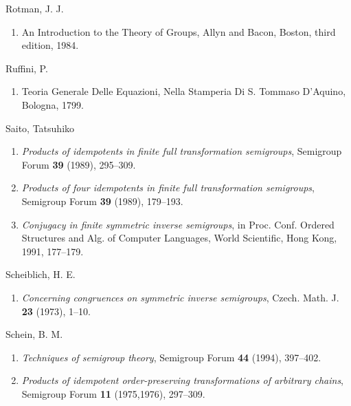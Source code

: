 \documentclass{surv-l}
\numberwithin{equation}{section}
\numberwithin{table}{section}
\numberwithin{figure}{section}
\theoremstyle{plain}
\theoremstyle{definition}
\begin{document}
\begin{thebibliography}{}
\item[] Rotman, J. J.
\begin{enumerate}
\item \label{bib65} An Introduction to the Theory of Groups, Allyn and Bacon,
Boston, third edition, 1984.
\end{enumerate}

\item[] Ruffini, P.
\begin{enumerate}
\item \label{bib66} Teoria Generale Delle Equazioni, Nella Stamperia Di S.
Tommaso D'Aquino, Bologna, 1799.
\end{enumerate}

\item[] Saito, Tatsuhiko
\begin{enumerate}
\item \label{bib67} \emph{Products of idempotents in finite full
transformation semigroups}, Semigroup Forum \textbf{39}
(1989), 295--309.

\item \label{bib67a} \emph{Products of four idempotents in finite full
transformation semigroups}, Semigroup Forum \textbf{39}
(1989), 179--193.

\item \label{bib67b} \emph{Conjugacy in finite symmetric inverse
semigroups}, in Proc. Conf. Ordered Structures and Alg. of
Computer Languages, World Scientific, Hong Kong, 1991,
177--179.
\end{enumerate}

\item[] Scheiblich, H. E.
\begin{enumerate}
\item \label{bib68} \emph{Concerning congruences on symmetric inverse
semigroups}, Czech. Math. J. \textbf{23} (1973), 1--10.
\end{enumerate}

\item[] Schein, B. M.
\begin{enumerate}
\item \label{bib69} \emph{Techniques of semigroup theory}, Semigroup Forum \textbf{44}
(1994), 397--402.

\item \label{bib69a} \emph{Products of idempotent order-preserving
transformations of arbitrary chains}, Semigroup Forum
\textbf{11} (1975,1976), 297--309.
\end{enumerate}


\end{thebibliography}
\end{document}
